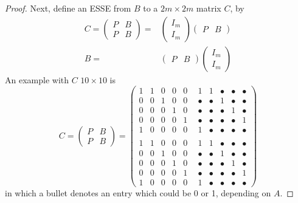 \documentclass{amsart}
\theoremstyle{definition}
\theoremstyle{remark}
\numberwithin{equation}{section}
\begin{document}
{{\begin{proof}
Next, 
define an ESSE from $B$ to a $2m\times 2m$ matrix $C$, by 
\begin{align*} 
C = 
\begin{pmatrix} 
P & B \\ 
P & B 
\end{pmatrix} 
= &
\begin{pmatrix} 
I_m \\ I_{m}  
\end{pmatrix} 
\begin{pmatrix} 
P&B
\end{pmatrix} \\ 
B  = &
 \begin{pmatrix} 
P & B 
\end{pmatrix}
\begin{pmatrix} 
I_m \\ I_{m}
\end{pmatrix} 
\end{align*} 
An example  with $C$ $10 \times 10$ is  
\[ \label{tenbyten}
C =
\begin{pmatrix} 
P & B \\ P & B 
\end{pmatrix} 
= 
\begin{pmatrix} 
1 & 1 & 0 & 0 & 0 &   \ \ 
1  & 1 & {\bullet} & {\bullet} & {\bullet} \\ 
0 & 0 & 1 & 0 & 0   &   \ \ 
{\bullet}  & {\bullet} & 1 & {\bullet} & {\bullet} \\ 
0 & 0 & 0 & 1 & 0   &   \ \ 
{\bullet}  & {\bullet} & {\bullet} & 1 & {\bullet} \\ 
0 & 0 & 0 & 0 & 1     &   \ \ 
{\bullet} & {\bullet} & {\bullet} & {\bullet} & 1 \\ 
1 & 0 & 0 & 0 & 0   &   \ \ 
1 & {\bullet} & {\bullet} & {\bullet} & {\bullet} \\ 
                                       \\ 
1 & 1 & 0 & 0 & 0   &   \ \ 
1 & 1 & {\bullet} & {\bullet} & {\bullet} \\ 
0 & 0 & 1 & 0 & 0   &   \ \ 
{\bullet}  & {\bullet} & 1 & {\bullet} & {\bullet} \\ 
0 & 0 & 0 & 1 & 0    &   \ \ 
{\bullet} & {\bullet} & {\bullet} & 1 & {\bullet} \\ 
0 & 0 & 0 & 0 & 1   &   \ \ 
 {\bullet}  & {\bullet} & {\bullet} & {\bullet} & 1 \\ 
1 & 0 & 0 & 0 & 0   &   \ \ 
1  & {\bullet} & {\bullet} & {\bullet} & {\bullet} 
\end{pmatrix}    
\]
in which a bullet denotes an entry which could be 0 or 1, depending on $A$. 


\end{proof}}}
\end{document}
